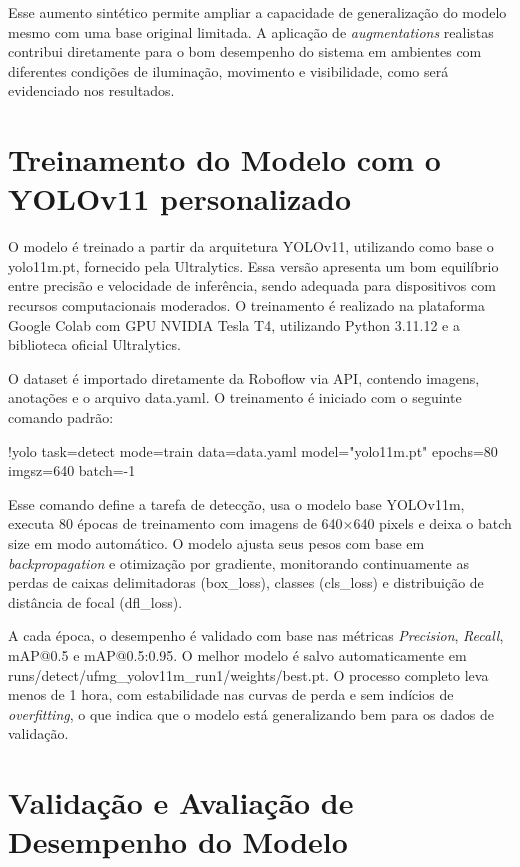 Esse aumento sintético permite ampliar a capacidade de generalização do modelo mesmo com uma base original limitada. A aplicação de \textit{augmentations} realistas contribui diretamente para o bom desempenho do sistema em ambientes com diferentes condições de iluminação, movimento e visibilidade, como será evidenciado nos resultados.

\section{\textbf{Treinamento do Modelo com o YOLOv11 personalizado}}

O modelo é treinado a partir da arquitetura YOLOv11, utilizando como base o yolo11m.pt, fornecido pela Ultralytics. Essa versão apresenta um bom equilíbrio entre precisão e velocidade de inferência, sendo adequada para dispositivos com recursos computacionais moderados. O treinamento é realizado na plataforma Google Colab com GPU NVIDIA Tesla T4, utilizando Python 3.11.12 e a biblioteca oficial Ultralytics.

O dataset é importado diretamente da Roboflow via API, contendo imagens, anotações e o arquivo data.yaml. O treinamento é iniciado com o seguinte comando padrão:

!yolo task=detect mode=train data=data.yaml model="yolo11m.pt" epochs=80\\imgsz=640 batch=-1

Esse comando define a tarefa de detecção, usa o modelo base YOLOv11m, executa 80 épocas de treinamento com imagens de 640×640 pixels e deixa o batch size em modo automático. O modelo ajusta seus pesos com base em \textit{backpropagation} e otimização por gradiente, monitorando continuamente as perdas de caixas delimitadoras (box\_loss), classes (cls\_loss) e distribuição de distância de focal (dfl\_loss).

A cada época, o desempenho é validado com base nas métricas \textit{Precision}, \textit{Recall}, mAP@0.5 e mAP@0.5:0.95. O melhor modelo é salvo automaticamente em runs/detect/ufmg\_yolov11m\_run1/weights/best.pt. O processo completo leva menos de 1 hora, com estabilidade nas curvas de perda e sem indícios de \textit{overfitting}, o que indica que o modelo está generalizando bem para os dados de validação.

\section{\textbf{Validação e Avaliação de Desempenho do Modelo}}

